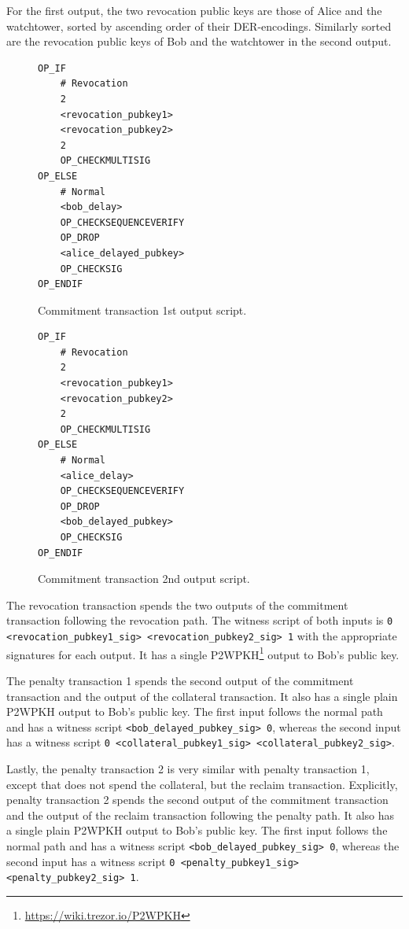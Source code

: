 \documentclass[runningheads]{llncs}
\begin{document}
For the first output, the two revocation public keys are those of Alice and the watchtower, sorted by ascending order of their DER-encodings. Similarly sorted are the revocation public keys of Bob and the watchtower in the second output.

\begin{figure}[ht!]
	\begin{verbatim}
OP_IF
    # Revocation
    2
    <revocation_pubkey1>
    <revocation_pubkey2>
    2
    OP_CHECKMULTISIG
OP_ELSE
    # Normal
    <bob_delay>
    OP_CHECKSEQUENCEVERIFY
    OP_DROP
    <alice_delayed_pubkey>
    OP_CHECKSIG
OP_ENDIF
    \end{verbatim}
\caption{Commitment transaction 1st output script.}
\label{script:commitment:first}	
\end{figure}

\begin{figure}[ht!]
	\begin{verbatim}
OP_IF
    # Revocation
    2
    <revocation_pubkey1>
    <revocation_pubkey2>
    2
    OP_CHECKMULTISIG
OP_ELSE
    # Normal
    <alice_delay>
    OP_CHECKSEQUENCEVERIFY
    OP_DROP
    <bob_delayed_pubkey>
    OP_CHECKSIG
OP_ENDIF
    \end{verbatim}
\caption{Commitment transaction 2nd output script.}
\label{script:commitment:second}	
\end{figure}

The revocation transaction spends the two outputs of the commitment transaction following the revocation path. The witness script of both inputs is \texttt{0 <revocation\_pubkey1\_sig> <revocation\_pubkey2\_sig> 1} with the appropriate signatures for each output. It has a single P2WPKH\footnote{\url{https://wiki.trezor.io/P2WPKH}} output to Bob's public key.

The penalty transaction 1 spends the second output of the commitment transaction and the output of the collateral transaction. It also has a single plain P2WPKH output to Bob's public key. The first input follows the normal path and has a witness script \texttt{<bob\_delayed\_pubkey\_sig> 0}, whereas the second input has a witness script \texttt{0 <collateral\_pubkey1\_sig> <collateral\_pubkey2\_sig>}.

Lastly, the penalty transaction 2 is very similar with penalty transaction 1, except that does not spend the collateral, but the reclaim transaction. Explicitly, penalty transaction 2 spends the second output of the commitment transaction and the output of the reclaim transaction following the penalty path. It also has a single plain P2WPKH output to Bob's public key. The first input follows the normal path and has a witness script \texttt{<bob\_delayed\_pubkey\_sig> 0}, whereas the second input has a witness script \texttt{0 <penalty\_pubkey1\_sig> <penalty\_pubkey2\_sig> 1}.
\end{document}
